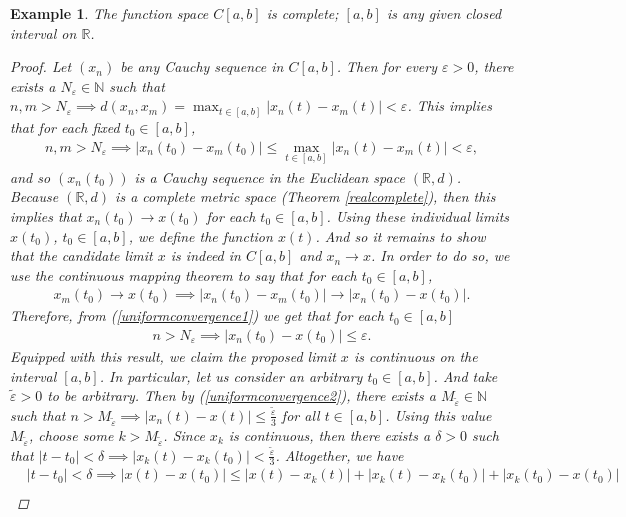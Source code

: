 \documentclass[11pt]{article}
\theoremstyle{mystyle}
\newtheorem{protoexamp}{Example}[section]
\newenvironment{examp}
{\colorlet{shadecolor}{orange!15}\begin{shaded}\begin{protoexamp}}
{\end{protoexamp}\end{shaded}}
\newcommand{\0}{\mathbf{0}}
\begin{document}
\begin{examp}\label{functioncomplete}
The function space $C[a, b]$ is complete; $[a,b]$ is any given closed interval on $\mathbb{R}$.
\begin{proof}
Let $(x_n)$ be any Cauchy sequence in $C[a, b]$. Then for every $\varepsilon > 0$, there exists a $N_{\varepsilon} \in \mathbb{N}$ such that $n, m > N_{\varepsilon} \implies d(x_n, x_m) = \max_{t \in [a, b]}|x_n(t) - x_m(t)| < \varepsilon$. This implies that for each fixed $t_0 \in [a, b]$, 
\begin{align}\label{uniformconvergence1}
    n, m > N_{\varepsilon} \implies |x_n(t_0) - x_m(t_0)| \leq \max_{t \in [a, b]}|x_n(t) - x_m(t)| < \varepsilon,
\end{align}
and so $(x_n(t_0))$ is a Cauchy sequence in the Euclidean space $(\mathbb{R}, d)$. Because $(\mathbb{R}, d)$ is a complete metric space (Theorem \ref{realcomplete}), then this implies that $x_n(t_0) \longrightarrow x(t_0)$ for each $t_0 \in [a, b]$. Using these individual limits $x(t_0)$, $t_0 \in [a, b]$, we define the function $x(t)$.\newline
And so it remains to show that the candidate limit $x$ is indeed in $C[a, b]$ and $x_n \longrightarrow x$. In order to do so, we use the continuous mapping theorem to say that for each $t_0 \in [a, b]$, 
\begin{align*}
x_m(t_0) \longrightarrow x(t_0) \implies |x_n(t_0) - x_m(t_0)| \longrightarrow |x_n(t_0) - x(t_0)|.
\end{align*}
Therefore, from (\ref{uniformconvergence1}) we get that for each $t_0 \in [a, b]$
\begin{align}\label{uniformconvergence2}
    n > N_{\varepsilon} \implies |x_n(t_0) - x(t_0)| \leq \varepsilon.
\end{align}
Equipped with this result, we claim the proposed limit $x$ is continuous on the interval $[a, b]$. In particular, let us consider an arbitrary $t_0 \in [a, b]$. And take $\tilde{\varepsilon} > 0$ to be arbitrary. Then by (\ref{uniformconvergence2}), there exists a $M_{\tilde{\varepsilon}} \in \mathbb{N}$ such that $n > M_{\tilde{\varepsilon}} \implies |x_n(t) - x(t)| \leq \frac{\tilde{\varepsilon}}{3}$ for all $t \in [a, b]$.
Using this value $M_{\tilde{\varepsilon}}$, choose some $k > M_{\tilde{\varepsilon}}$. Since $x_k$ is continuous, then there exists a $\delta > 0$ such that $|t - t_0| < \delta \implies |x_k(t) - x_k(t_0)| < \frac{\tilde{\varepsilon}}{3}$. Altogether, we have
\begin{align*}
    &|t - t_0| < \delta \implies |x(t) - x(t_0)| \leq |x(t) - x_k(t)| + |x_k(t) - x_k(t_0)| + |x_k(t_0) - x(t_0)|\\

\end{align*}
\end{proof}
\end{examp}
\end{document}
